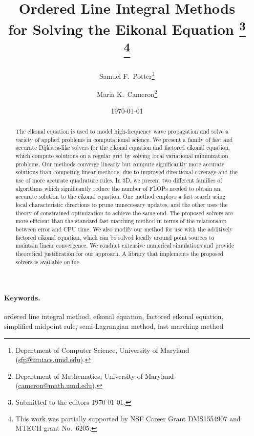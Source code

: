 \documentclass{article}
\begin{document}
\title{
  Ordered Line Integral Methods \\
  for Solving the Eikonal Equation
  \thanks{Submitted to the editors \today.}
  \footnote{This work was partially supported by NSF Career Grant
    DMS1554907 and MTECH grant No.\ 6205.}
}
\author{
  Samuel F.\ Potter\thanks{Department of Computer Science,
    University of Maryland (\href{mailto:sfp@umiacs.umd.edu}{sfp@umiacs.umd.edu}).}
  \and Maria K.\ Cameron\thanks{Department of Mathematics,
    University of Maryland (\href{mailto:cameron@math.umd.edu}{cameron@math.umd.edu}).}
}
\date{\today}

\maketitle

\begin{abstract}
  The eikonal equation is used to model high-frequency wave
  propagation and solve a variety of applied problems in computational
  science. We present a family of fast and accurate Dijkstra-like
  solvers for the eikonal equation and factored eikonal equation,
  which compute solutions on a regular grid by solving local
  variational minimization problems. Our methods converge linearly but
  compute significantly more accurate solutions than competing linear
  methods, due to improved directional coverage and the use of more
  accurate quadrature rules. In 3D, we present two different families
  of algorithms which significantly reduce the number of FLOPs needed
  to obtain an accurate solution to the eikonal equation. One method
  employs a fast search using local characteristic directions to prune
  unnecessary updates, and the other uses the theory of constrained
  optimization to achieve the same end. The proposed solvers are more
  efficient than the standard fast marching method in terms of the
  relationship between error and CPU time. We also modify our method
  for use with the additively factored eikonal equation, which can be
  solved locally around point sources to maintain linear
  convergence. We conduct extensive numerical simulations and provide
  theoretical justification for our approach. A library that
  implements the proposed solvers is available online.
\end{abstract}

\paragraph{Keywords.} ordered line integral method, eikonal equation,
factored eikonal equation, simplified midpoint rule, semi-Lagrangian
method, fast marching method
\end{document}
